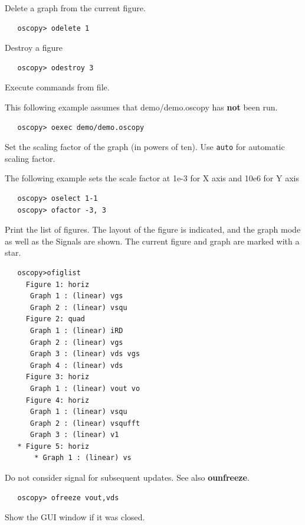 \documentclass[a4paper,11pt]{report}
\begin{document}
   Delete a graph from the current figure.

\begin{lstlisting}
   oscopy> odelete 1
\end{lstlisting}

   Destroy a figure

\begin{lstlisting}
   oscopy> odestroy 3
\end{lstlisting}

   Execute commands from file.

   This following example assumes that demo/demo.oscopy has \textbf{not} been run.

\begin{lstlisting}
   oscopy> oexec demo/demo.oscopy
\end{lstlisting}

   Set the scaling factor of the graph (in powers of ten). Use \texttt{auto} for automatic scaling factor.

\noindent   The following example sets the scale factor at 1e-3 for X axis and 10e6 for Y axis
\begin{lstlisting}
   oscopy> oselect 1-1
   oscopy> ofactor -3, 3
\end{lstlisting}

   Print the list of figures. The layout of the figure is indicated, and the graph mode as well as the Signals are shown. The current figure and graph are marked with a star.
\begin{lstlisting}
   oscopy>ofiglist
     Figure 1: horiz
      Graph 1 : (linear) vgs
      Graph 2 : (linear) vsqu
     Figure 2: quad
      Graph 1 : (linear) iRD
      Graph 2 : (linear) vgs
      Graph 3 : (linear) vds vgs
      Graph 4 : (linear) vds
     Figure 3: horiz
      Graph 1 : (linear) vout vo
     Figure 4: horiz
      Graph 1 : (linear) vsqu
      Graph 2 : (linear) vsqufft
      Graph 3 : (linear) v1
   * Figure 5: horiz
       * Graph 1 : (linear) vs
\end{lstlisting}

   Do not consider signal for subsequent updates. See also \textbf{ounfreeze}.
\begin{lstlisting}
   oscopy> ofreeze vout,vds
\end{lstlisting}

   Show the GUI window if it was closed.
\end{document}
